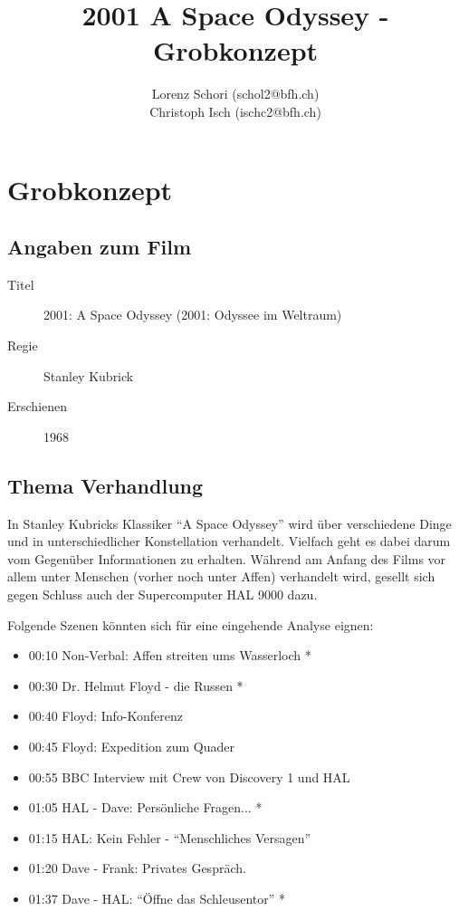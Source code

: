 \documentclass[a4paper,titlepage]{scrartcl}
\title{2001 A Space Odyssey - Grobkonzept}
\author{Lorenz Schori (schol2@bfh.ch)\\Christoph Isch (ischc2@bfh.ch)}
\begin{document}
\maketitle
\newpage


\section{Grobkonzept}

\subsection{Angaben zum Film}

\begin{description}
    \item[Titel]{2001: A Space Odyssey (2001: Odyssee im Weltraum)}
    \item[Regie]{Stanley Kubrick}
    \item[Erschienen]{1968}
\end{description}

\subsection{Thema Verhandlung}

In Stanley Kubricks Klassiker "`A Space Odyssey"' wird über verschiedene Dinge 
und in unterschiedlicher Konstellation verhandelt. Vielfach geht es dabei darum 
vom Gegenüber Informationen zu erhalten. Während am Anfang des Films vor allem 
unter Menschen (vorher noch unter Affen) verhandelt wird, gesellt sich gegen 
Schluss auch der Supercomputer HAL 9000 dazu.

Folgende Szenen könnten sich für eine eingehende Analyse eignen:

\begin{itemize}
    \item{00:10 Non-Verbal: Affen streiten ums Wasserloch *}
    \item{00:30 Dr. Helmut Floyd - die Russen *}
    \item{00:40 Floyd: Info-Konferenz}
    \item{00:45 Floyd: Expedition zum Quader}
    \item{00:55 BBC Interview mit Crew von Discovery 1 und HAL}
    \item{01:05 HAL - Dave: Persönliche Fragen... *}
    \item{01:15 HAL: Kein Fehler - "`Menschliches Versagen"'}
    \item{01:20 Dave - Frank: Privates Gespräch.}
    \item{01:37 Dave - HAL: "`Öffne das Schleusentor"' *}
\end{itemize}
\end{document}
